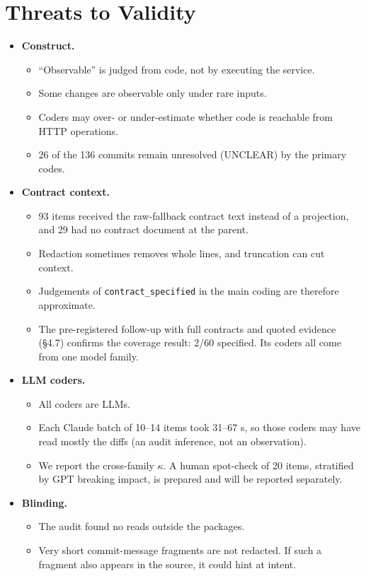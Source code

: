 \documentclass[conference]{IEEEtran}
\begin{document}
\section{Threats to Validity}
\begin{itemize}
\item \textbf{Construct.}
\begin{itemize}
\item ``Observable'' is judged from code, not by executing the service.
\item Some changes are observable only under rare inputs.
\item Coders may over- or under-estimate whether code is reachable from HTTP operations.
\item 26 of the 136 commits remain unresolved (UNCLEAR) by the primary codes.
\end{itemize}
\item \textbf{Contract context.}
\begin{itemize}
\item 93 items received the raw-fallback contract text instead of a projection, and 29 had no contract document at the parent.
\item Redaction sometimes removes whole lines, and truncation can cut context.
\item Judgements of \texttt{contract\_specified} in the main coding are therefore approximate.
\item The pre-registered follow-up with full contracts and quoted evidence (\S{}4.7) confirms the coverage result: 2/60 specified. Its coders all come from one model family.
\end{itemize}
\item \textbf{LLM coders.}
\begin{itemize}
\item All coders are LLMs.
\item Each Claude batch of 10--14 items took 31--67 s, so those coders may have read mostly the diffs (an audit inference, not an observation).
\item We report the cross-family $\kappa$. A human spot-check of 20 items, stratified by GPT breaking impact, is prepared and will be reported separately.
\end{itemize}
\item \textbf{Blinding.}
\begin{itemize}
\item The audit found no reads outside the packages.
\item Very short commit-message fragments are not redacted. If such a fragment also appears in the source, it could hint at intent.

\end{itemize}
\end{itemize}
\end{document}
